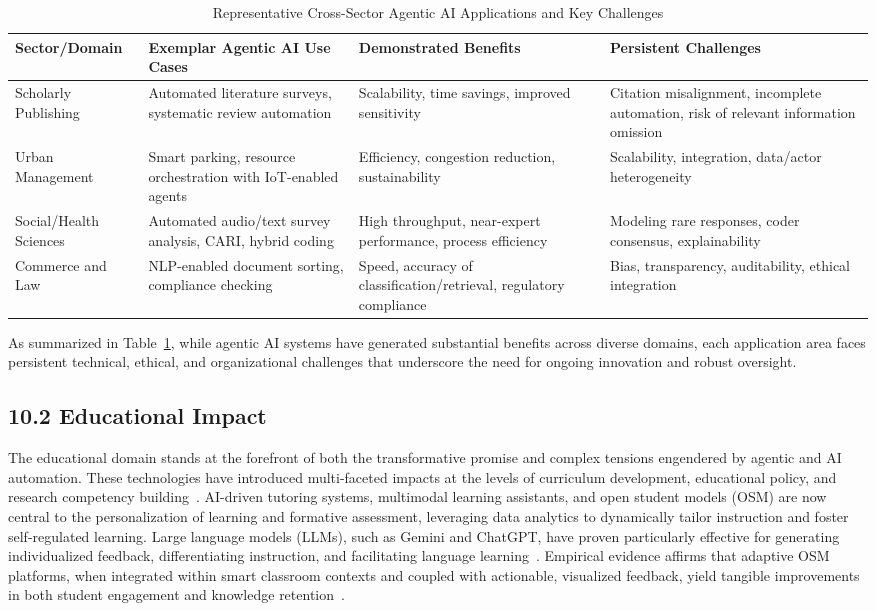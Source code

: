 \documentclass[11pt]{article}
\begin{document}
\begin{table}[htbp]
  \centering
  \caption{Representative Cross-Sector Agentic AI Applications and Key Challenges}
  \label{tab:cross_domain_applications}
  \begin{tabular}{|p{2.8cm}|p{3.4cm}|p{3.2cm}|p{4.0cm}|}
  \hline
  \textbf{Sector/Domain} & \textbf{Exemplar Agentic AI Use Cases} & \textbf{Demonstrated Benefits} & \textbf{Persistent Challenges} \\
  \hline
  Scholarly Publishing & Automated literature surveys, systematic review automation & Scalability, time savings, improved sensitivity & Citation misalignment, incomplete automation, risk of relevant information omission \\
  \hline
  Urban Management & Smart parking, resource orchestration with IoT-enabled agents & Efficiency, congestion reduction, sustainability & Scalability, integration, data/actor heterogeneity \\
  \hline
  Social/Health Sciences & Automated audio/text survey analysis, CARI, hybrid coding & High throughput, near-expert performance, process efficiency & Modeling rare responses, coder consensus, explainability \\
  \hline
  Commerce and Law & NLP-enabled document sorting, compliance checking & Speed, accuracy of classification/retrieval, regulatory compliance & Bias, transparency, auditability, ethical integration \\
  \hline
  \end{tabular}
\end{table}

As summarized in Table~\ref{tab:cross_domain_applications}, while agentic AI systems have generated substantial benefits across diverse domains, each application area faces persistent technical, ethical, and organizational challenges that underscore the need for ongoing innovation and robust oversight.

\subsection{10.2 Educational Impact}

The educational domain stands at the forefront of both the transformative promise and complex tensions engendered by agentic and AI automation. These technologies have introduced multi-faceted impacts at the levels of curriculum development, educational policy, and research competency building~\cite{ref109,ref110,ref111,ref112,ref113,ref114,ref115}. AI-driven tutoring systems, multimodal learning assistants, and open student models (OSM) are now central to the personalization of learning and formative assessment, leveraging data analytics to dynamically tailor instruction and foster self-regulated learning. Large language models (LLMs), such as Gemini and ChatGPT, have proven particularly effective for generating individualized feedback, differentiating instruction, and facilitating language learning~\cite{ref109,ref110,ref111}. Empirical evidence affirms that adaptive OSM platforms, when integrated within smart classroom contexts and coupled with actionable, visualized feedback, yield tangible improvements in both student engagement and knowledge retention~\cite{ref110,ref111}.
\end{document}
